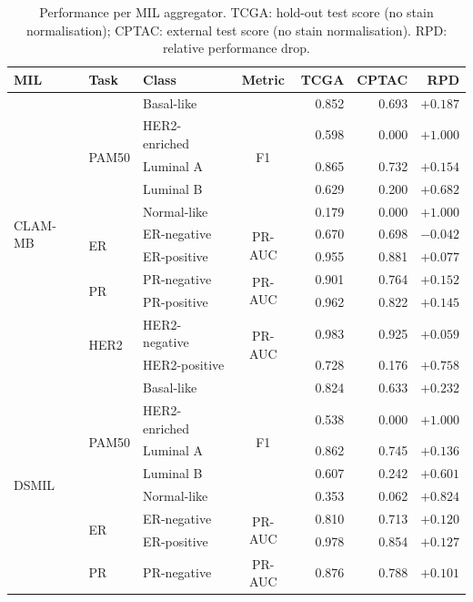 \begin{table}[ht]
\centering
\caption{Performance per MIL aggregator. TCGA: hold-out test score (no stain normalisation); CPTAC: external test score (no stain normalisation). RPD: relative performance drop.}
\label{tab:mccv-ho-performance}
\begin{tabular}{lllcrrr}
\toprule
\textbf{MIL} & \textbf{Task} & \textbf{Class} & \textbf{Metric} & \textbf{TCGA} & \textbf{CPTAC} & \textbf{RPD} \\
\midrule
   \multirow{11}{*}{CLAM-MB} & \multirow{5}{*}{PAM50} & Basal-like & \multirow{5}{*}{F1} & 0.852 & 0.693 & $+0.187$ \\
    &  & HER2-enriched &  & 0.598 & 0.000 & $+1.000$ \\
    &  & Luminal A &  & 0.865 & 0.732 & $+0.154$ \\
    &  & Luminal B &  & 0.629 & 0.200 & $+0.682$ \\
    &  & Normal-like &  & 0.179 & 0.000 & $+1.000$ \\
    & \multirow{2}{*}{ER} & ER-negative & \multirow{2}{*}{PR-AUC} & 0.670 & 0.698 & $-0.042$ \\
    &  & ER-positive &  & 0.955 & 0.881 & $+0.077$ \\
    & \multirow{2}{*}{PR} & PR-negative & \multirow{2}{*}{PR-AUC} & 0.901 & 0.764 & $+0.152$ \\
    &  & PR-positive &  & 0.962 & 0.822 & $+0.145$ \\
    & \multirow{2}{*}{HER2} & HER2-negative & \multirow{2}{*}{PR-AUC} & 0.983 & 0.925 & $+0.059$ \\
    &  & HER2-positive &  & 0.728 & 0.176 & $+0.758$ \\
\midrule
   \multirow{11}{*}{DSMIL} & \multirow{5}{*}{PAM50} & Basal-like & \multirow{5}{*}{F1} & 0.824 & 0.633 & $+0.232$ \\
    &  & HER2-enriched &  & 0.538 & 0.000 & $+1.000$ \\
    &  & Luminal A &  & 0.862 & 0.745 & $+0.136$ \\
    &  & Luminal B &  & 0.607 & 0.242 & $+0.601$ \\
    &  & Normal-like &  & 0.353 & 0.062 & $+0.824$ \\
    & \multirow{2}{*}{ER} & ER-negative & \multirow{2}{*}{PR-AUC} & 0.810 & 0.713 & $+0.120$ \\
    &  & ER-positive &  & 0.978 & 0.854 & $+0.127$ \\
    & \multirow{2}{*}{PR} & PR-negative & \multirow{2}{*}{PR-AUC} & 0.876 & 0.788 & $+0.101$ \\

\end{tabular}
\end{table}
